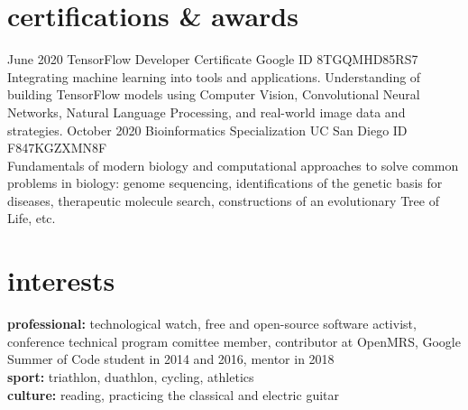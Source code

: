 \documentclass[]{cv-style}          %
\begin{document}
\section{certifications \& awards}

\begin{entrylist}
\entry
{June 2020}
{TensorFlow Developer Certificate}
{Google}
{ID 8TGQMHD85RS7 \\ Integrating machine learning into tools and applications. Understanding of building TensorFlow models using Computer Vision, Convolutional Neural Networks, Natural Language Processing, and real-world image data and strategies.}
\entry
{October 2020}
{Bioinformatics Specialization}
{UC San Diego}
{ID F847KGZXMN8F \\ Fundamentals of modern biology and computational approaches to solve common problems in biology: genome sequencing, identifications of the genetic basis for diseases, therapeutic molecule search, constructions of an evolutionary Tree of Life, etc.}
\end{entrylist}


\section{interests}
  \vspace{-0.2cm}

\textbf{professional:} technological watch, free and open-source software activist, conference technical program comittee member, contributor at OpenMRS, Google Summer of Code student in 2014 and 2016, mentor in 2018\\
\textbf{sport:} triathlon, duathlon, cycling, athletics \\
\textbf{culture:} reading, practicing the classical and electric guitar
\end{document}
